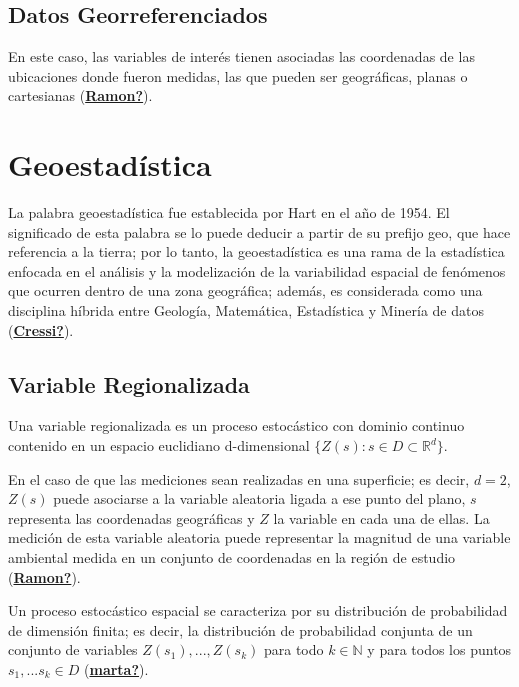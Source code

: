 \documentclass[
]{book}
\begin{document}
\hypertarget{datos-georreferenciados}{%
\subsection{Datos Georreferenciados}\label{datos-georreferenciados}}

En este caso, las variables de interés tienen asociadas las coordenadas de las ubicaciones donde fueron medidas, las que pueden ser geográficas, planas o cartesianas (\protect\hyperlink{ref-Ramon}{\textbf{Ramon?}}).

\hypertarget{geoestaduxedstica-1}{%
\section{Geoestadística}\label{geoestaduxedstica-1}}

La palabra geoestadística fue establecida por Hart en el año de 1954. El significado de esta palabra se lo puede deducir a partir de su prefijo geo, que hace referencia a la tierra; por lo tanto, la geoestadística es una rama de la estadística enfocada en el análisis y la modelización de la variabilidad espacial de fenómenos que ocurren dentro de una zona geográfica; además, es considerada como una disciplina híbrida entre Geología, Matemática, Estadística y Minería de datos (\protect\hyperlink{ref-Cressi}{\textbf{Cressi?}}).

\hypertarget{variable-regionalizada}{%
\subsection{Variable Regionalizada}\label{variable-regionalizada}}

Una variable regionalizada es un proceso estocástico con dominio continuo contenido en un espacio euclidiano d-dimensional \(\{Z(s):s\in D\subset \mathbb{R}^d\}\).

En el caso de que las mediciones sean realizadas en una superficie; es decir, \(d=2\), \(Z(s)\) puede asociarse a la variable aleatoria ligada a ese punto del plano, \(s\) representa las coordenadas geográficas y \(Z\) la variable en cada una de ellas. La medición de esta variable aleatoria puede representar la magnitud de una variable ambiental medida en un conjunto de coordenadas en la región de estudio (\protect\hyperlink{ref-Ramon}{\textbf{Ramon?}}).

Un proceso estocástico espacial se caracteriza por su distribución de probabilidad de dimensión finita; es decir, la distribución de probabilidad conjunta de un conjunto de variables \(Z(s_1),...,Z(s_k)\) para todo \(k \in \mathbb{N}\) y para todos los puntos \(s_1,...s_k \in D\) (\protect\hyperlink{ref-marta}{\textbf{marta?}}).
\end{document}
